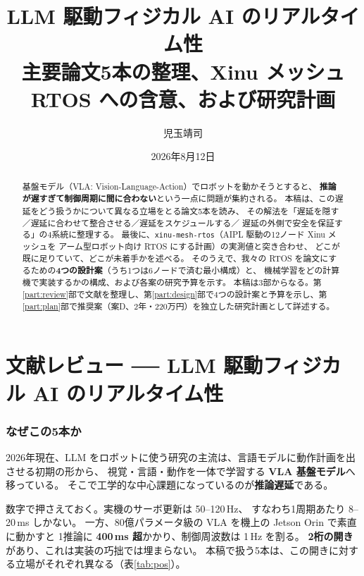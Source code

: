 \documentclass[11pt,a4paper]{article}
\title{\vspace{-12mm}
  \Large LLM 駆動フィジカル AI のリアルタイム性\\[2mm]
  \large 主要論文5本の整理、Xinu メッシュ RTOS への含意、および研究計画\\[1mm]}
\author{\normalsize 児玉靖司}
\date{\normalsize 2026年8月12日}
\newcommand{\code}[1]{\texttt{#1}}
\newcommand{\prob}[1]{\textbf{\textcolor{red!55!black}{#1}}}
\newcommand{\keyp}[1]{\textbf{\textcolor{blue!45!black}{#1}}}
\begin{document}
\maketitle
\vspace{-6mm}

\begin{abstract}
\noindent
基盤モデル（VLA: Vision-Language-Action）でロボットを動かそうとすると、
\prob{推論が遅すぎて制御周期に間に合わない}という一点に問題が集約される。
本稿は、この遅延をどう扱うかについて異なる立場をとる論文5本を読み、
その解法を「遅延を隠す／遅延に合わせて整合させる／遅延をスケジュールする／
遅延の外側で安全を保証する」の4系統に整理する。
最後に、\code{xinu-mesh-rtos}（AIPL 駆動の12ノード Xinu メッシュを
アーム型ロボット向け RTOS にする計画）の実測値と突き合わせ、
どこが既に足りていて、どこが未着手かを述べる。
そのうえで、我々の RTOS を論文にするための\keyp{4つの設計案}（うち1つは6ノードで済む最小構成）と、
機械学習をどの計算機で実装するかの構成、および各案の研究予算を示す。
本稿は3部からなる。第\ref{part:review}部で文献を整理し、第\ref{part:design}部で4つの設計案と予算を示し、第\ref{part:plan}部で推奨案（案D、2年・220万円）を独立した研究計画として詳述する。
\end{abstract}

\vspace{-2mm}
{\small\tableofcontents}
\clearpage

\part{文献レビュー ── LLM 駆動フィジカル AI のリアルタイム性}
\label{part:review}

\section{なぜこの5本か}

2026年現在、LLM をロボットに使う研究の主流は、言語モデルに動作計画を出させる初期の形から、
視覚・言語・動作を一体で学習する \keyp{VLA 基盤モデル}へ移っている。
そこで工学的な中心課題になっているのが\prob{推論遅延}である。

数字で押さえておく。実機のサーボ更新は 50--120\,Hz、
すなわち1周期あたり 8--20\,ms しかない。
一方、80億パラメータ級の VLA を機上の Jetson Orin で素直に動かすと
1推論に \prob{400\,ms 超}かかり、制御周波数は 1\,Hz を割る。
\keyp{2桁の開き}があり、これは実装の巧拙では埋まらない。
本稿で扱う5本は、この開きに対する立場がそれぞれ異なる（表\ref{tab:pos}）。
\end{document}
